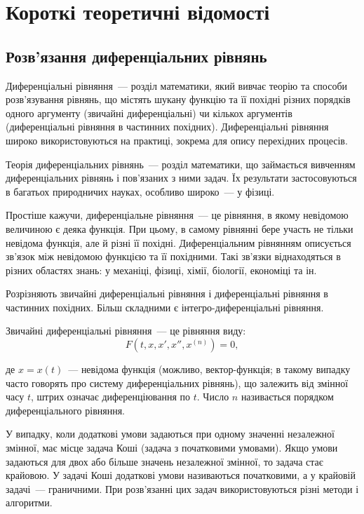 \section{Короткі теоретичні відомості}
\subsection{Розв’язання диференціальних рівнянь}

Диференціальні рівняння~--- розділ математики, який вивчає теорію та способи розв'язування рівнянь, що містять шукану функцію та її похідні різних порядків одного аргументу (звичайні диференціальні) чи кількох аргументів (диференціальні рівняння в частинних похідних). Диференціальні рівняння широко використовуються на практиці, зокрема для опису перехідних процесів.

Теорія диференціальних рівнянь~--- розділ математики, що займається вивченням диференціальних рівнянь і пов'язаних з ними задач. Їх результати застосовуються в багатьох природничих науках, особливо широко~--- у фізиці.

Простіше кажучи, диференціальне рівняння~--- це рівняння, в якому невідомою величиною є деяка функція. При цьому, в самому рівнянні бере участь не тільки невідома функція, але й різні її похідні. Диференціальним рівнянням описується зв'язок між невідомою функцією та її похідними. Такі зв'язки віднаходяться в різних областях знань: у механіці, фізиці, хімії, біології, економіці та ін.

Розрізняють звичайні диференціальні рівняння і диференціальні рівняння в частинних похідних. Більш складними є інтегро-диференціальні рівняння.

Звичайні диференціальні рівняння~--- це рівняння виду:
    \begin{equation}\label{eq:simple_difur}
        F(t,x,x',x'',x^{(n)}) =0,
    \end{equation}

де $x=x(t)$~--- невідома функція (можливо, вектор-функція; в такому випадку часто говорять про систему диференціальних рівнянь), що залежить від змінної часу $t$, штрих означає диференціювання по $t$. Число $n$ називається порядком диференціального рівняння.

У випадку, коли додаткові умови задаються при одному значенні незалежної змінної, має місце задача Коші (задача з початковими умовами). Якщо умови задаються для двох або більше значень незалежної змінної, то задача стає крайовою. У задачі Коші додаткові умови називаються початковими, а у крайовій задачі~--- граничними. При розв’язанні цих задач використовуються різні методи і алгоритми.

